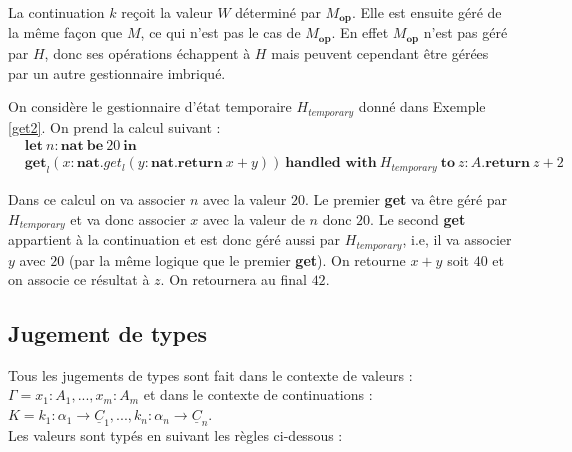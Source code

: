 	La continuation $k$ reçoit la valeur $W$ déterminé par $M_\textbf{op}$. Elle est ensuite géré de la même façon que $M$, ce qui n'est pas le cas de $M_\textbf{op}$. En effet $M_\textbf{op}$ n'est pas géré par $H$, donc ses opérations échappent à $H$ mais peuvent cependant être gérées par un autre gestionnaire imbriqué. 
	
	\begin{exemple}\label{get3}
		On considère le gestionnaire d'état temporaire $H_{temporary}$ donné dans Exemple \ref{get2}. On prend la calcul suivant :
		\begin{align*}
		 &\textbf{let}~n:\textbf{nat}~\textbf{be}~20~\textbf{in}&\\
		&\textbf{get}_l(x:\textbf{nat}.get_l(y:\textbf{nat}.\textbf{return}~x+y))~\textbf{handled~with}~H_{temporary}~\textbf{to}~z:A.\textbf{return}~z+2
		\end{align*}
	
	Dans ce calcul on va associer $n$ avec la valeur $20$. Le premier \textbf{get} va être géré par $H_{temporary}$ et va donc associer $x$ avec la valeur de $n$ donc $20$. Le second \textbf{get} appartient à la continuation et est donc géré aussi par $H_{temporary}$, i.e, il va associer $y$ avec $20$ (par la même logique que le premier \textbf{get}). On retourne $x + y$ soit $40$ et on associe ce résultat à $z$. On retournera au final $42$.
	\end{exemple}
	
\subsection{Jugement de types}

	Tous les jugements de types sont fait dans le contexte de valeurs : $\Gamma = x_1:A_1,...,x_m:A_m$ et dans le contexte de continuations : $K = k_1:\alpha_1 \rightarrow \underline{C}_1,...,k_n:\alpha_n \rightarrow \underline{C}_n$.
	\\
	Les valeurs sont typés en suivant les règles ci-dessous : 
		
		
